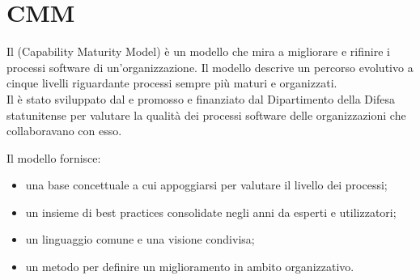 
\section{CMM}
\label{appendice A}

Il  (Capability Maturity Model) è un modello che mira a migliorare e rifinire i processi software di un'organizzazione. Il modello descrive un percorso evolutivo a cinque livelli riguardante processi sempre più maturi e organizzati. \\
Il  è stato sviluppato dal  e promosso e finanziato dal Dipartimento della Difesa statunitense per valutare la qualità dei processi software delle organizzazioni che collaboravano con esso.

Il modello fornisce:
\begin{itemize}
	\item una base concettuale a cui appoggiarsi per valutare il livello dei processi;
\item un insieme di best practices consolidate negli anni da esperti e utilizzatori;
\item un linguaggio comune e una visione condivisa;
\item un metodo per definire un miglioramento in ambito organizzativo.
\end{itemize}

